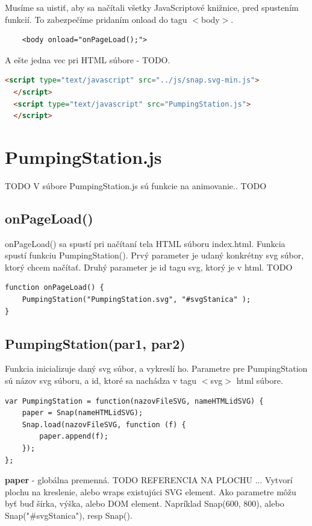 Musíme sa uistiť, aby sa načítali všetky JavaScriptové knižnice, pred spustením funkcií. To zabezpečíme pridaním  onload do tagu $<$body$>$. 
\begin{lstlisting}
	<body onload="onPageLoad();">
\end{lstlisting}

A ešte jedna vec pri HTML súbore - TODO. 
\begin{lstlisting}[language = HTML]
  <script type="text/javascript" src="../js/snap.svg-min.js">
  </script>
  <script type="text/javascript" src="PumpingStation.js">
  </script>
\end{lstlisting}


\section{PumpingStation.js}
TODO
V súbore PumpingStation.js sú funkcie na animovanie.. TODO
\subsection{onPageLoad()}
onPageLoad() sa spustí pri načítaní tela HTML súboru index.html. Funkcia spustí funkciu PumpingStation(). Prvý parameter je udaný konkrétny svg súbor, ktorý chcem načítať. Druhý parameter je id tagu svg, ktorý je v html. TODO

\begin{lstlisting}
function onPageLoad() {
	PumpingStation("PumpingStation.svg", "#svgStanica" );
}
\end{lstlisting}

\subsection{PumpingStation(par1, par2)}

Funkcia inicializuje daný svg súbor, a vykreslí ho. 
Parametre pre PumpingStation sú názov svg súboru, a id, ktoré sa nachádza v tagu $<$svg$>$ html súbore.

\begin{lstlisting}
var PumpingStation = function(nazovFileSVG, nameHTMLidSVG) {
	paper = Snap(nameHTMLidSVG);
	Snap.load(nazovFileSVG, function (f) {
		paper.append(f);
	});
};
\end{lstlisting}

\textbf{paper} - globálna premenná. TODO REFERENCIA NA PLOCHU ... Vytvorí plochu na  kreslenie, alebo  wraps existujúci SVG element. Ako parametre môžu byť buď šírka, výška, alebo DOM element. Napríklad Snap(600, 800), alebo Snap("\#svgStanica"), resp Snap(). 

